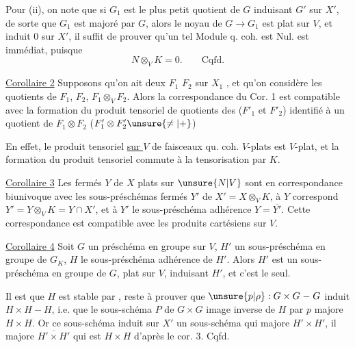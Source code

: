 Pour (ii), on note que si
$G_1$ est le plus petit  quotient
de $G$ induisant $G'$ sur $X'$, 
de sorte que $G_1$ est  majoré par $G$,
alors le noyau de  $G\to G_1$ est  plat sur $V$,
et induit $0$ sur $X'$, il suffit de
prouver qu'un tel Module q. coh. est
Nul.  est immédiat, puisque
\[
N\otimes_V K=0.\qquad \text{Cqfd.}
\]

\uline{Corollaire 2} Supposons qu'on ait deux
$F_1$  $F_2$  sur $X_1$ , et qu'on considère les
 quotients de $F_1$, $F_2$, $F_1\otimes_V F_2$. Alors
la correspondance du Cor. 1 est compatible
avec la formation du  produit tensoriel
de quotients des  ($F'_1$ et $F'_2$)
identifié à un quotient de $F_1\otimes F_2$ ($F'_1\otimes F'_2\unsure{\neq|{+}}$)

En effet, le produit tensoriel \uline{sur $V$}
de faisceaux qu. coh. $V$-plats est $V$-plat,
et la  formation du produit tensoriel
commute à la tensorisation par $K$.

\uline{Corollaire 3}  Les 
fermés $Y$ de $X$ plats sur $\unsure{N|V}$ sont en
correspondance biunivoque avec les
sous-préschémas fermés $Y'$ de $X'=X\otimes_V K$,
à $Y$ correspond $Y'=Y\otimes_V K=Y\cap X'$, et
à $Y'$  le sous-préschéma
adhérence $Y=\overline{Y'}$. Cette correspondance
est compatible avec les produits
cartésiens sur $V$.

\uline{Corollaire 4} Soit $G$ un préschéma en
groupe sur $V$, $H'$ un sous-préschéma en
groupe  de $G_K$, $H$ le sous-préschéma
adhérence de $H'$. Alors $H'$ est un
sous-préschéma en groupe de $G$, plat
sur $V$,  induisant $H'$, et c'est
le seul.

Il est  que $H$ est stable par
, reste à prouver que
$\unsure{p|\rho}:G\times G\mathrel{-}G$ induit $H\times H\mathrel{-}H$, i.e.
que le sous-schéma  $P$ de $G\times G$
image inverse de $H$ par $p$  majore
$H\times H$. Or ce sous-schéma induit
sur $X'$ un sous-schéma qui majore
$H'\times H'$,  il majore $\overline{H'\times H'}$ qui est
$H\times H$ d'après le cor. 3. Cqfd.

